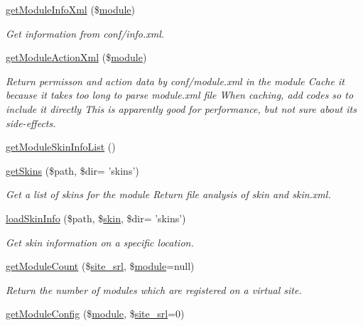 \begin{DoxyCompactItemize}
\hyperlink{classmoduleModel_ae4e9287674bddc605dfc4cef77f8c1bb}{get\-Module\-Info\-Xml} (\$\hyperlink{classmodule}{module})
\begin{DoxyCompactList}\small\item\em Get information from conf/info.\-xml. \end{DoxyCompactList}\item 
\hyperlink{classmoduleModel_a2d53da77f2504357f99b93a2ad09981a}{get\-Module\-Action\-Xml} (\$\hyperlink{classmodule}{module})
\begin{DoxyCompactList}\small\item\em Return permisson and action data by conf/module.\-xml in the module Cache it because it takes too long to parse module.\-xml file When caching, add codes so to include it directly This is apparently good for performance, but not sure about its side-\/effects. \end{DoxyCompactList}\item 
\hyperlink{classmoduleModel_a9fae8e7a41eda8e384cb46d25430ae82}{get\-Module\-Skin\-Info\-List} ()
\item 
\hyperlink{classmoduleModel_af48d0cb71ef8e732a67872f80d95f884}{get\-Skins} (\$path, \$dir= 'skins')
\begin{DoxyCompactList}\small\item\em Get a list of skins for the module Return file analysis of skin and skin.\-xml. \end{DoxyCompactList}\item 
\hyperlink{classmoduleModel_af2f585723dfb8b8993f0e884136e45bb}{load\-Skin\-Info} (\$path, \$\hyperlink{ko_8install_8php_ab0f2b49fdb57754496b34f6b880cdeaf}{skin}, \$dir= 'skins')
\begin{DoxyCompactList}\small\item\em Get skin information on a specific location. \end{DoxyCompactList}\item 
\hyperlink{classmoduleModel_a2b22943c4d212c8284ef9780e0ebf3bd}{get\-Module\-Count} (\$\hyperlink{ko_8install_8php_a8b1406b4ad1048041558dce6bfe89004}{site\-\_\-srl}, \$\hyperlink{classmodule}{module}=null)
\begin{DoxyCompactList}\small\item\em Return the number of modules which are registered on a virtual site. \end{DoxyCompactList}\item 
\hyperlink{classmoduleModel_ae8005c8ab7ee3b9e6ddd7f71bb2b4698}{get\-Module\-Config} (\$\hyperlink{classmodule}{module}, \$\hyperlink{ko_8install_8php_a8b1406b4ad1048041558dce6bfe89004}{site\-\_\-srl}=0)

\end{DoxyCompactItemize}
